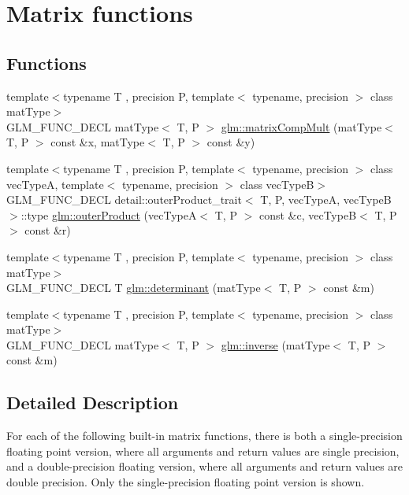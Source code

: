 \hypertarget{group__core__func__matrix}{}\section{Matrix functions}
\label{group__core__func__matrix}
\subsection*{Functions}
\begin{DoxyCompactItemize}
\item 
{\footnotesize template$<$typename T , precision P, template$<$ typename, precision $>$ class mat\+Type$>$ }\\G\+L\+M\+\_\+\+F\+U\+N\+C\+\_\+\+D\+E\+CL mat\+Type$<$ T, P $>$ \hyperlink{group__core__func__matrix_ga4a54992e4741188ee624b21e3ba91814}{glm\+::matrix\+Comp\+Mult} (mat\+Type$<$ T, P $>$ const \&x, mat\+Type$<$ T, P $>$ const \&y)
\item 
{\footnotesize template$<$typename T , precision P, template$<$ typename, precision $>$ class vec\+TypeA, template$<$ typename, precision $>$ class vec\+TypeB$>$ }\\G\+L\+M\+\_\+\+F\+U\+N\+C\+\_\+\+D\+E\+CL detail\+::outer\+Product\+\_\+trait$<$ T, P, vec\+TypeA, vec\+TypeB $>$\+::type \hyperlink{group__core__func__matrix_gae9f513dc8e4f3ceb993669321b6d0f09}{glm\+::outer\+Product} (vec\+TypeA$<$ T, P $>$ const \&c, vec\+TypeB$<$ T, P $>$ const \&r)
\item 
{\footnotesize template$<$typename T , precision P, template$<$ typename, precision $>$ class mat\+Type$>$ }\\G\+L\+M\+\_\+\+F\+U\+N\+C\+\_\+\+D\+E\+CL T \hyperlink{group__core__func__matrix_ga26ea77c574802bc6fc193c40478718d2}{glm\+::determinant} (mat\+Type$<$ T, P $>$ const \&m)
\item 
{\footnotesize template$<$typename T , precision P, template$<$ typename, precision $>$ class mat\+Type$>$ }\\G\+L\+M\+\_\+\+F\+U\+N\+C\+\_\+\+D\+E\+CL mat\+Type$<$ T, P $>$ \hyperlink{group__core__func__matrix_ga7635d3dbe5aa10ff73a0e6903bf6bea5}{glm\+::inverse} (mat\+Type$<$ T, P $>$ const \&m)
\end{DoxyCompactItemize}


\subsection{Detailed Description}
For each of the following built-\/in matrix functions, there is both a single-\/precision floating point version, where all arguments and return values are single precision, and a double-\/precision floating version, where all arguments and return values are double precision. Only the single-\/precision floating point version is shown. 

